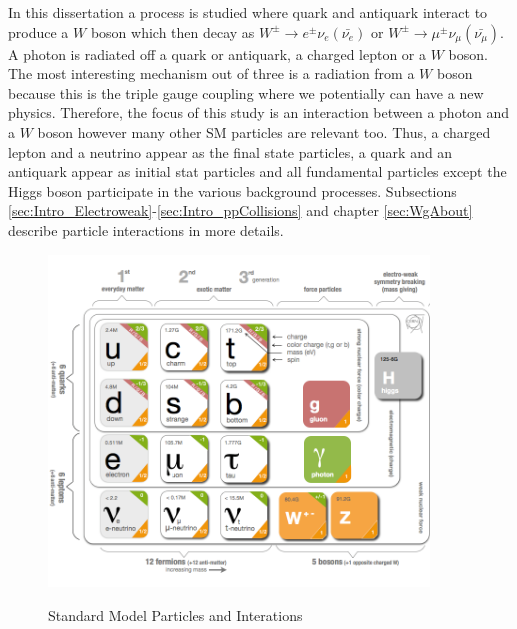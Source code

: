 In this dissertation a process is studied where quark and antiquark interact to produce a $W$ boson which then decay as $W^\pm \rightarrow e^\pm \nu_e(\bar{\nu_e})$ or $W^\pm \rightarrow \mu^\pm \nu_\mu(\bar{\nu_\mu}) $. A photon is radiated off a quark or antiquark, a charged lepton or a $W$ boson. The most interesting mechanism out of three is a radiation from a $W$ boson because this is the triple gauge coupling where we potentially can have a new physics. Therefore, the focus of this study is an interaction between a photon and a $W$ boson however many other SM particles are relevant too. Thus, a charged lepton and a neutrino appear as the final state particles, a quark and an antiquark appear as initial stat particles and all fundamental particles except the Higgs boson participate in the various background processes. Subsections \ref{sec:Intro_Electroweak}-\ref{sec:Intro_ppCollisions} and chapter \ref{sec:WgAbout} describe particle interactions in more details.\\


\begin{figure}[htb]
  \begin{center}
    {\includegraphics[width=0.90\textwidth]{../figs/Intro/StandardModel.png}}
    \caption{Standard Model Particles and Interations}
    \label{fig:SMtable}
  \end{center}
\end{figure}





